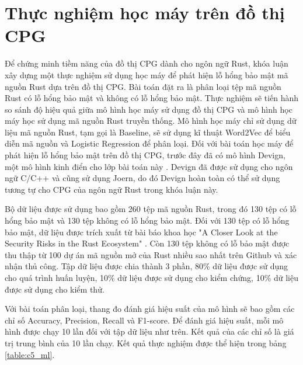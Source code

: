 \section{Thực nghiệm học máy trên đồ thị CPG}


Để chứng minh tiềm năng của đồ thị CPG dành cho ngôn ngữ Rust, khóa luận xây dựng một thực nghiệm sử dụng học máy để phát hiện lỗ hổng bảo mật mã nguồn Rust dựa trên đồ thị CPG.
Bài toán đặt ra là phân loại tệp mã nguồn Rust có lỗ hổng bảo mật và không có lỗ hổng bảo mật.
Thực nghiệm sẽ tiến hành so sánh độ hiệu quả giữa mô hình học máy sử dụng đồ thị CPG và mô hình học máy học sử dụng mã nguồn Rust truyền thống.
Mô hình học máy chỉ sử dụng dữ liệu mã nguồn Rust, tạm gọi là Baseline, sẽ sử dụng kĩ thuật Word2Vec để biểu diễn mã nguồn và Logistic Regression để phân loại.
Đối với bài toán học máy để phát hiện lỗ hổng bảo mật trên đồ thị CPG, trước đây đã có mô hình Devign, một mô hình kinh điển cho lớp bài toán này \cite{zhou2019devign}.
Devign đã được sử dụng cho ngôn ngữ C/C++ và cũng sử dụng Joern, do đó Devign hoàn toàn có thể sử dụng tương tự cho CPG của ngôn ngữ Rust trong khóa luận này.

Bộ dữ liệu được sử dụng bao gồm 260 tệp mã nguồn Rust, trong đó 130 tệp có lỗ hổng bảo mật và 130 tệp không có lỗ hổng bảo mật.
Đối với 130 tệp có lỗ hổng bảo mật, dữ liệu được trích xuất từ bài báo khoa học "A Closer Look at the Security Risks in the Rust Ecosystem" \cite{zheng2023closer}.
Còn 130 tệp không có lỗ bảo mật được thu thập từ 100 dự án mã nguồn mở của Rust nhiều sao nhất trên Github \cite{githubGithubRankingTop100RustmdMaster} và xác nhận thủ công.
Tập dữ liệu được chia thành 3 phần, 80\% dữ liệu được sử dụng cho quá trình huấn luyện, 10\% dữ liệu được sử dụng cho kiểm chứng, 10\% dữ liệu được sử dụng cho kiểm thử.

Với bài toán phân loại, thang đo đánh giá hiệu suất của mô hình sẽ bao gồm các chỉ số Accuracy, Precision, Recall và F1-score.
Để đánh giá hiệu suất, mỗi mô hình được chạy 10 lần đối với tập dữ liệu như trên.
Kết quả của các chỉ số là giá trị trung bình của 10 lần chạy.
Kết quả thực nghiệm được thể hiện trong bảng \ref{table:c5_ml}.

